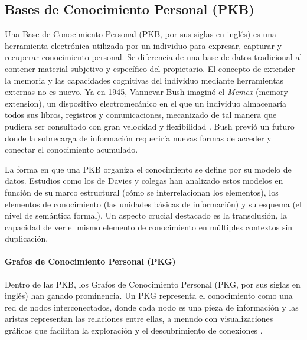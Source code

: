 \subsection{Bases de Conocimiento Personal (PKB)}
\label{subsec:pkb}
Una Base de Conocimiento Personal (PKB, por sus siglas en inglés) es una herramienta electrónica utilizada por un individuo para expresar, capturar y recuperar conocimiento personal. Se diferencia de una base de datos tradicional al contener material subjetivo y específico del propietario. El concepto de extender la memoria y las capacidades cognitivas del individuo mediante herramientas externas no es nuevo. Ya en 1945, Vannevar Bush imaginó el \textit{Memex} (memory extension), un dispositivo electromecánico en el que un individuo almacenaría todos sus libros, registros y comunicaciones, mecanizado de tal manera que pudiera ser consultado con gran velocidad y flexibilidad \citep{bushWeMayThink1945}. Bush previó un futuro donde la sobrecarga de información requeriría nuevas formas de acceder y conectar el conocimiento acumulado.

La forma en que una PKB organiza el conocimiento se define por su modelo de datos. Estudios como los de Davies y colegas \citep{daviesBuildingMemexSixty, daviesStillBuildingMemex2011} han analizado estos modelos en función de su marco estructural (cómo se interrelacionan los elementos), los elementos de conocimiento (las unidades básicas de información) y su esquema (el nivel de semántica formal). Un aspecto crucial destacado es la transclusión, la capacidad de ver el mismo elemento de conocimiento en múltiples contextos sin duplicación.

\paragraph{Grafos de Conocimiento Personal (PKG)}
Dentro de las PKB, los Grafos de Conocimiento Personal (PKG, por sus siglas en inglés) han ganado prominencia. Un PKG representa el conocimiento como una red de nodos interconectados, donde cada nodo es una pieza de información y las aristas representan las relaciones entre ellas, a menudo con visualizaciones gráficas que facilitan la exploración y el descubrimiento de conexiones \citep{pyneMetaworkHowWe2022}.

